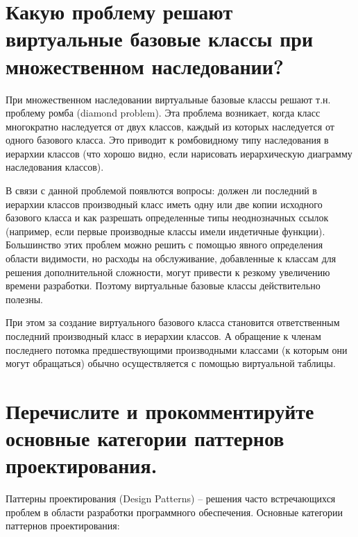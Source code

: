 \documentclass[a4paper,12pt]{article}	%
\begin{document}
\newpage

\section{Какую проблему решают виртуальные базовые классы при множественном наследовании?}

	При множественном наследовании виртуальные базовые классы решают т.н. проблему ромба (diamond problem). Эта проблема возникает, когда класс многократно наследуется от двух классов, каждый из которых наследуется от одного базового класса. Это приводит к ромбовидному типу наследования в иерархии классов (что хорошо видно, если нарисовать иерархическую диаграмму наследования классов).
	
	В связи с данной проблемой появлются вопросы: должен ли последний в иерархии классов производный класс иметь одну или две копии исходного базового класса и как разрешать определенные типы неоднозначных ссылок (например, если первые производные классы имели индетичные функции). Большинство этих проблем можно решить с помощью явного определения области видимости, но расходы на обслуживание, добавленные к классам для решения дополнительной сложности, могут привести к резкому увеличению времени разработки. Поэтому виртуальные базовые классы действительно полезны.
	
	При этом за создание виртуального базового класса становится ответственным последний производный класс в иерархии классов. А обращение к членам последнего потомка предшествующими производными классами (к которым они могут обращаться) обычно осуществляется с помощью виртуальной таблицы.

\newpage

\section{Перечислите и прокомментируйте основные категории паттернов проектирования.}

	Паттерны проектирования (Design Patterns) -- решения часто встречающихся проблем в области разработки программного обеспечения. Основные категории паттернов проектирования:
	
\end{document}

